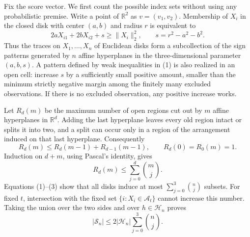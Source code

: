 Fix the score vector.  We first count the possible index sets without using any probabilistic premise.  Write a point of \(\mathbb R^2\) as \(v=(v_1,v_2)\).  Membership of \(X_i\) in the closed disk with center \((a,b)\) and radius \(r\) is equivalent to
\[
 2aX_{i1}+2bX_{i2}+s\ge \lVert X_i\rVert_2^2,
 \qquad s=r^2-a^2-b^2. \tag{1}
\]
Thus the traces on \(X_1,\ldots,X_n\) of Euclidean disks form a subcollection of the sign patterns generated by \(n\) affine hyperplanes in the three-dimensional parameter \((a,b,s)\).  A pattern defined by weak inequalities in (1) is also realized in an open cell: increase \(s\) by a sufficiently small positive amount, smaller than the minimum strictly negative margin among the finitely many excluded observations.  If there is no excluded observation, any positive increase works.

Let \(R_d(m)\) be the maximum number of open regions cut out by \(m\) affine hyperplanes in \(\mathbb R^d\).  Adding the last hyperplane leaves every old region intact or splits it into two, and a split can occur only in a region of the arrangement induced on that last hyperplane.  Consequently
\[
 R_d(m)\le R_d(m-1)+R_{d-1}(m-1),
 \qquad R_d(0)=R_0(m)=1. \tag{2}
\]
Induction on \(d+m\), using Pascal's identity, gives
\[
 R_d(m)\le\sum_{j=0}^d\binom mj. \tag{3}
\]
Equations (1)--(3) show that all disks induce at most \(\sum_{j=0}^3\binom nj\) subsets.  For fixed \(t\), intersection with the fixed set \(\{i:X_i\in\mathcal A_t\}\) cannot increase this number.  Taking the union over the two sides and over \(h\in\mathcal H_n\) proves
\[
 |\mathscr S_n|\le 2|\mathcal H_n|\sum_{j=0}^3\binom nj. \tag{4}
\]

